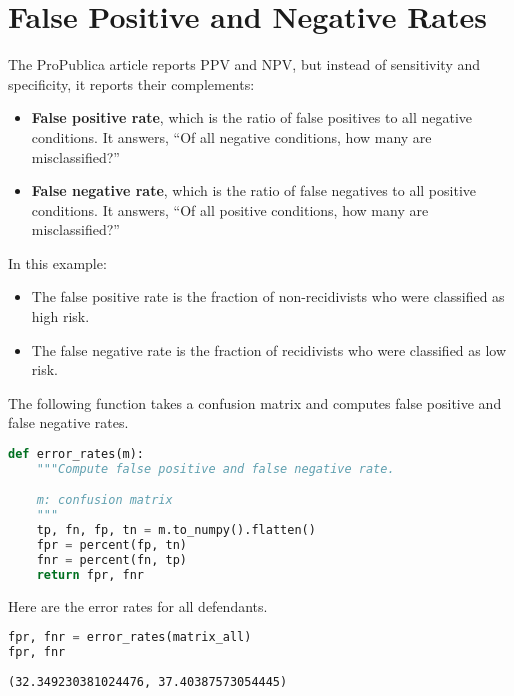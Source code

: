 \section{False Positive and Negative
Rates}\label{false-positive-and-negative-rates}

The ProPublica article reports PPV and NPV, but instead of sensitivity
and specificity, it reports their complements:

\begin{itemize}
\item
  \textbf{False positive rate}, which is the ratio of false positives to
  all negative conditions. It answers, ``Of all negative conditions, how
  many are misclassified?''
\item
  \textbf{False negative rate}, which is the ratio of false negatives to
  all positive conditions. It answers, ``Of all positive conditions, how
  many are misclassified?''
\end{itemize}

In this example:

\begin{itemize}
\item
  The false positive rate is the fraction of non-recidivists who were
  classified as high risk.
\item
  The false negative rate is the fraction of recidivists who were
  classified as low risk.
\end{itemize}

The following function takes a confusion matrix and computes false
positive and false negative rates.

\begin{lstlisting}[language=Python,style=source]
def error_rates(m):
    """Compute false positive and false negative rate.

    m: confusion matrix
    """
    tp, fn, fp, tn = m.to_numpy().flatten()
    fpr = percent(fp, tn)
    fnr = percent(fn, tp)
    return fpr, fnr
\end{lstlisting}

Here are the error rates for all defendants.

\begin{lstlisting}[language=Python,style=source]
fpr, fnr = error_rates(matrix_all)
fpr, fnr
\end{lstlisting}

\begin{lstlisting}[style=output]
(32.349230381024476, 37.40387573054445)
\end{lstlisting}


